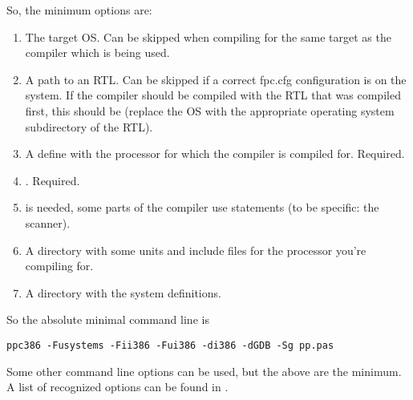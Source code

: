 So, the minimum options are:
\begin{enumerate}
\item The target OS. Can be skipped when compiling for the same target as
the compiler which is being used.
\item A path to an RTL. Can be skipped if a correct fpc.cfg configuration
is on the system. If the compiler should be compiled with the RTL that was
compiled first, this should be  (replace the OS with the 
appropriate operating system subdirectory of the RTL).
\item A define with the processor for which the compiler is compiled for. Required.
\item {}. Required.
\item {} is needed, some parts of the compiler use 
statements (to be specific: the scanner).
\item A directory with some units and include files for the processor you're compiling for.
\item A directory with the system definitions.
\end{enumerate}
So the absolute minimal command line is
\begin{verbatim}
ppc386 -Fusystems -Fii386 -Fui386 -di386 -dGDB -Sg pp.pas
\end{verbatim}

Some other command line options can be used, but the above are the
minimum. A list of recognized options can be found in .

